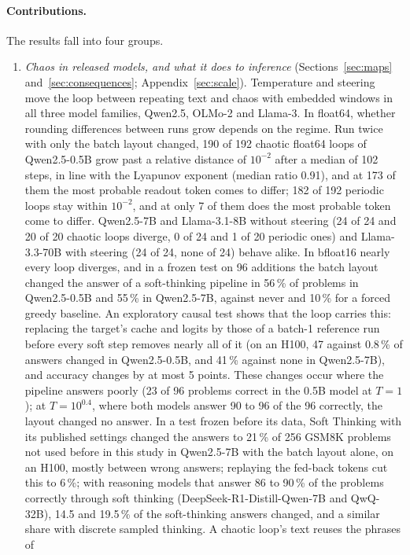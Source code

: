 \documentclass[11pt,letterpaper]{article}
\begin{document}
\paragraph{Contributions.} The results fall into four groups.
\begin{enumerate}
\item \emph{Chaos in released models, and what it does to inference} (Sections~\ref{sec:maps}
  and~\ref{sec:consequences}; Appendix~\ref{sec:scale}). Temperature and steering move the loop between repeating text and chaos with embedded windows in all three model families, Qwen2.5, OLMo-2 and Llama-3. In float64, whether rounding differences between runs grow depends on the regime. Run twice with only the batch layout changed, 190 of 192 chaotic float64 loops of Qwen2.5-0.5B grow past
  a relative distance of $10^{-2}$ after a median of 102 steps, in line with the Lyapunov exponent (median ratio
  0.91), and at 173 of them the most probable readout token comes to differ; 182 of 192 periodic loops stay within
  $10^{-2}$, and at only 7 of them does the most probable token come to differ. Qwen2.5-7B and Llama-3.1-8B without steering (24 of 24 and 20 of 20 chaotic loops diverge, 0 of 24 and 1
  of 20 periodic ones) and Llama-3.3-70B with steering (24 of 24, none of 24) behave alike. In bfloat16 nearly every
  loop diverges, and in a frozen test on 96 additions the batch layout changed the answer of a soft-thinking pipeline
  in 56\,\% of problems in Qwen2.5-0.5B and 55\,\% in Qwen2.5-7B, against never and 10\,\% for a forced greedy
  baseline. An exploratory causal test shows that the loop carries this: replacing the target's cache and logits by those of a batch-1 reference run before every soft step
  removes nearly all of it (on an H100, 47 against 0.8\,\% of answers changed in Qwen2.5-0.5B, and 41\,\% against
  none in Qwen2.5-7B), and accuracy changes by at most 5 points. These changes occur where the pipeline answers poorly
  (23 of 96 problems correct in the 0.5B model at $T=1$); at $T=10^{0.4}$, where both models answer 90 to 96 of the 96
  correctly, the layout changed no answer. In a test frozen before its data, Soft Thinking with its published
  settings changed the answers to 21\,\% of 256 GSM8K problems not used before in this study in Qwen2.5-7B with the batch layout alone, on an
  H100, mostly between wrong answers; replaying the fed-back tokens cut this to 6\,\%; with reasoning models that answer 86 to 90\,\% of the problems correctly through soft thinking (DeepSeek-R1-Distill-Qwen-7B and QwQ-32B), 14.5 and 19.5\,\% of the soft-thinking answers changed, and a similar share with discrete sampled thinking. A chaotic loop's text reuses the phrases of

\end{enumerate}
\end{document}
